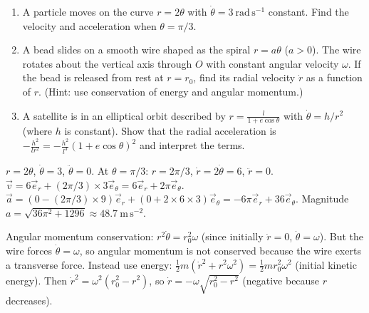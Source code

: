 \documentclass[11pt]{article}
\begin{document}
\begin{exercice}
\begin{enumerate}
\item A particle moves on the curve $r = 2\theta$ with $\dot{\theta} = 3\ \mathrm{rad\,s^{-1}}$ constant.  Find the velocity and acceleration when $\theta = \pi/3$.
\item A bead slides on a smooth wire shaped as the spiral $r = a\theta$ ($a>0$).  The wire rotates about the vertical axis through $O$ with constant angular velocity $\omega$.  If the bead is released from rest at $r = r_0$, find its radial velocity $\dot{r}$ as a function of $r$.  (Hint: use conservation of energy and angular momentum.)
\item A satellite is in an elliptical orbit described by $r = \frac{l}{1+e\cos\theta}$ with $\dot{\theta} = h/r^2$ (where $h$ is constant).  Show that the radial acceleration is $-\frac{h^2}{l r^2} = -\frac{h^2}{l^3}(1+e\cos\theta)^2$ and interpret the terms.
\end{enumerate}
\end{exercice}

\begin{corrige}[Exercise 1]
$r = 2\theta$, $\dot{\theta}=3$, $\ddot{\theta}=0$.  At $\theta=\pi/3$: $r=2\pi/3$, $\dot{r}=2\dot{\theta}=6$, $\ddot{r}=0$.
$\vec{v} = 6\vec{e}_r + (2\pi/3)\times3\vec{e}_\theta = 6\vec{e}_r + 2\pi\vec{e}_\theta$.
$\vec{a} = (0 - (2\pi/3)\times9)\vec{e}_r + (0 + 2\times6\times3)\vec{e}_\theta = -6\pi\vec{e}_r + 36\vec{e}_\theta$.
Magnitude $a = \sqrt{36\pi^2 + 1296} \approx 48.7\ \mathrm{m\,s^{-2}}$.
\end{corrige}

\begin{corrige}[Exercise 2]
Angular momentum conservation: $r^2\dot{\theta} = r_0^2\omega$ (since initially $\dot{r}=0$, $\dot{\theta}=\omega$).  But the wire forces $\dot{\theta}=\omega$, so angular momentum is not conserved because the wire exerts a transverse force.  Instead use energy: $\frac12 m(\dot{r}^2 + r^2\omega^2) = \frac12 m r_0^2\omega^2$ (initial kinetic energy).  Then $\dot{r}^2 = \omega^2(r_0^2 - r^2)$, so $\dot{r} = -\omega\sqrt{r_0^2 - r^2}$ (negative because $r$ decreases).
\end{corrige}
\end{document}
